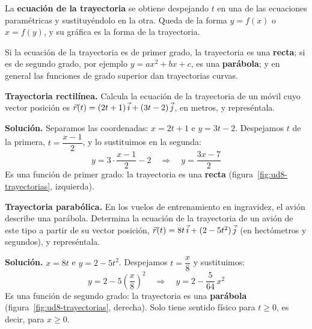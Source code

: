 \begin{definition}
    La \textbf{ecuación de la trayectoria} se obtiene despejando \(t\) en una de las ecuaciones paramétricas y sustituyéndolo en la
    otra. Queda de la forma \(y = f(x)\) o \(x = f(y)\), y su gráfica es la forma de la trayectoria.
\end{definition}

Si la ecuación de la trayectoria es de primer grado, la trayectoria es una \textbf{recta}; si es de segundo grado, por ejemplo
\(y = a x^2 + b x + c\), es una \textbf{parábola}; y en general las funciones de grado superior dan trayectorias curvas.

\begin{example}
    \textbf{Trayectoria rectilínea.} Calcula la ecuación de la trayectoria de un móvil cuyo vector posición es
    \(\vec r(t) = (2t + 1)\,\vec{i} + (3t - 2)\,\vec{j}\), en metros, y represéntala.

    \textbf{Solución.} Separamos las coordenadas: \(x = 2t + 1\) e \(y = 3t - 2\). Despejamos \(t\) de la primera,
    \(t = \dfrac{x - 1}{2}\), y lo sustituimos en la segunda:
    \[ y = 3 \cdot \frac{x - 1}{2} - 2 \quad\Rightarrow\quad y = \frac{3x - 7}{2} \]
    Es una función de primer grado: la trayectoria es una \textbf{recta} (figura~\ref{fig:ud8-trayectorias}, izquierda).
\end{example}

\begin{example}
    \textbf{Trayectoria parabólica.} En los vuelos de entrenamiento en ingravidez, el avión describe una parábola. Determina la
    ecuación de la trayectoria de un avión de este tipo a partir de su vector posición, \(\vec r(t) = 8t\,\vec{i} + (2 - 5t^2)\,\vec{j}\)
    (en hectómetros y segundos), y represéntala.

    \textbf{Solución.} \(x = 8t\) e \(y = 2 - 5t^2\). Despejamos \(t = \dfrac{x}{8}\) y sustituimos:
    \[ y = 2 - 5 \left(\frac{x}{8}\right)^2 \quad\Rightarrow\quad y = 2 - \frac{5}{64}\,x^2 \]
    Es una función de segundo grado: la trayectoria es una \textbf{parábola} (figura~\ref{fig:ud8-trayectorias}, derecha). Solo
    tiene sentido físico para \(t \geq 0\), es decir, para \(x \geq 0\).
\end{example}

